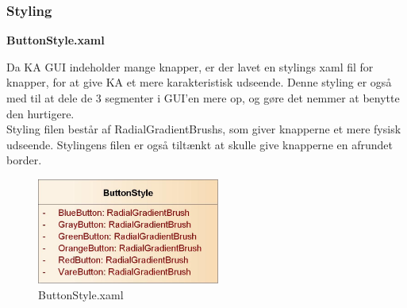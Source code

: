 \subsubsection{Styling}

\textbf{ButtonStyle.xaml}

Da \gls{KA} \gls{GUI} indeholder mange knapper, er der lavet en stylings xaml fil for knapper, for at give \gls{KA} et mere karakteristisk udseende. Denne styling er også med til at dele de 3 segmenter i GUI'en mere op, og gøre det nemmer at benytte den hurtigere. \\
Styling filen består af RadialGradientBrushs, som giver knapperne et mere fysisk udseende. Stylingens filen er også tiltænkt at skulle give knapperne en afrundet border.

\begin{figure}[H]
	\centering
	\includegraphics[width=60mm]{Systemdesign/Frontend/GUI/Pics/xaml}
	\caption{ButtonStyle.xaml}
	\label{fig:ButtonStyleXaml}
\end{figure}
